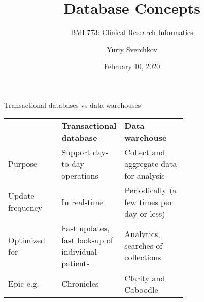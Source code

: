 \documentclass[aspectratio=169]{beamer}
\title{Database Concepts}
\subtitle{BMI 773: Clinical Research Informatics}
\author{Yuriy Sverchkov}
\institute{University of Wisconsin--Madison}
\date{February 10, 2020}
\begin{document}
	
	{
		\begin{frame}[plain]
			\vskip4cm
			\titlepage
		\end{frame}
	}

	\begin{frame}{Transactional databases vs data warehouses}
		\centering
		
		
		\begin{tabular}{lp{0.35\linewidth}p{0.35\linewidth}}
			& \textbf{Transactional database} & \textbf{Data warehouse} \\
			Purpose & Support day-to-day operations & Collect and aggregate data for analysis \\
			Update frequency & In real-time & Periodically (a few times per day or less) \\
			Optimized for & Fast updates, fast look-up of individual patients & Analytics, searches of collections \\
			Epic e.g. & Chronicles & Clarity and Caboodle
		\end{tabular}
		
	\end{frame}

\end{document}
